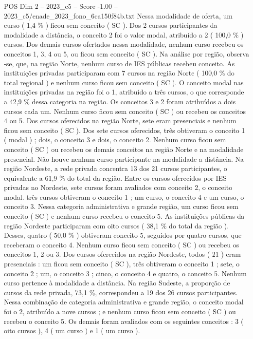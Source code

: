 \begin{textsample}{POS Dim 2 – 2023\_c5 – Score -1.00 – 2023\_c5/enade\_2023\_fono\_6ca150f84b.txt}
Nessa modalidade de oferta, um curso ( 1,4 \% ) ficou sem conceito ( SC ).
Dos 2 cursos participantes da modalidade a distância, o conceito 2 foi o valor modal, atribuído a 2 ( 100,0 \% ) cursos.
Dos demais cursos ofertados nessa modalidade, nenhum curso recebeu os conceitos 1, 3, 4 ou 5, ou ficou sem conceito ( SC ).
Na análise por região, observa -se, que, na região Norte, nenhum curso de IES públicas recebeu conceito.
As instituições privadas participaram com 7 cursos na região Norte ( 100,0 \% do total regional ) e nenhum curso ficou sem conceito ( SC ).
O conceito modal nas instituições privadas na região foi o 1, atribuído a três cursos, o que corresponde a 42,9 \% dessa categoria na região.
Os conceitos 3 e 2 foram atribuídos a dois cursos cada um.
Nenhum curso ficou sem conceito ( SC ) ou recebeu os conceitos 4 ou 5.
Dos cursos oferecidos na região Norte, sete eram presenciais e nenhum ficou sem conceito ( SC ).
Dos sete cursos oferecidos, três obtiveram o conceito 1 ( modal ) ; dois, o conceito 3 e dois, o conceito 2.
Nenhum curso ficou sem conceito ( SC ) ou recebeu os demais conceitos na região Norte e na modalidade presencial.
Não houve nenhum curso participante na modalidade a distância.
Na região Nordeste, a rede privada concentra 13 dos 21 cursos participantes, o equivalente a 61,9 \% do total da região.
Entre os cursos oferecidos por IES privadas no Nordeste, sete cursos foram avaliados com conceito 2, o conceito modal. três cursos obtiveram o conceito 1 ; um curso, o conceito 4 e um curso, o conceito 3.
Nessa categoria administrativa e grande região, um curso ficou sem conceito ( SC ) e nenhum curso recebeu o conceito 5.
As instituições públicas da região Nordeste participaram com oito cursos ( 38,1 \% do total da região ).
Desses, quatro ( 50,0 \% ) obtiveram conceito 5, seguidos por quatro cursos, que receberam o conceito 4.
Nenhum curso ficou sem conceito ( SC ) ou recebeu os conceitos 1, 2 ou 3.
Dos cursos oferecidos na região Nordeste, todos ( 21 ) eram presenciais : um ficou sem conceito ( SC ), três obtiveram o conceito 1 ; sete, o conceito 2 ; um, o conceito 3 ; cinco, o conceito 4 e quatro, o conceito 5.
Nenhum curso pertence à modalidade a distância.
Na região Sudeste, a proporção de cursos da rede privada, 73,1 \%, correspondeu a 19 dos 26 cursos participantes.
Nessa combinação de categoria administrativa e grande região, o conceito modal foi o 2, atribuído a nove cursos ; e nenhum curso ficou sem conceito ( SC ) ou recebeu o conceito 5.
Os demais foram avaliados com os seguintes conceitos : 3 ( oito cursos ), 4 ( um curso ) e 1 ( um curso ).

\end{textsample}
